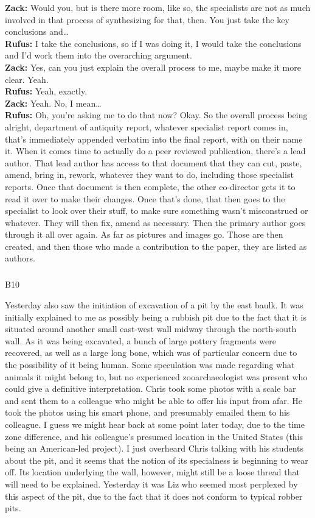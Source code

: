 \documentclass[
  canadian,
]{article}
\makeatletter
\let\oldsubparagraph\subparagraph
\renewcommand{\subparagraph}{
    \@ifstar
      \xxxSubParagraphStar
      \xxxSubParagraphNoStar
  }
\newcommand{\xxxSubParagraphStar}[1]{\oldsubparagraph*{#1}\mbox{}}
\newcommand{\xxxSubParagraphNoStar}[1]{\oldsubparagraph{#1}\mbox{}}
\makeatother
\begin{document}
\textbf{Zack:} Would you, but is there more room, like so, the
specialists are not as much involved in that process of synthesizing for
that, then. You just take the key conclusions and\ldots{}\\
\textbf{Rufus:} I take the conclusions, so if I was doing it, I would
take the conclusions and I'd work them into the overarching argument.\\
\textbf{Zack:} Yes, can you just explain the overall process to me,
maybe make it more clear. Yeah.\\
\textbf{Rufus:} Yeah, exactly.\\
\textbf{Zack:} Yeah. No, I mean\ldots{}\\
\textbf{Rufus:} Oh, you're asking me to do that now? Okay. So the
overall process being alright, department of antiquity report, whatever
specialist report comes in, that's immediately appended verbatim into
the final report, with on their name it. When it comes time to actually
do a peer reviewed publication, there's a lead author. That lead author
has access to that document that they can cut, paste, amend, bring in,
rework, whatever they want to do, including those specialist reports.
Once that document is then complete, the other co-director gets it to
read it over to make their changes. Once that's done, that then goes to
the specialist to look over their stuff, to make sure something wasn't
misconstrued or whatever. They will then fix, amend as necessary. Then
the primary author goes through it all over again. As far as pictures
and images go. Those are then created, and then those who made a
contribution to the paper, they are listed as authors.

\subparagraph{B10}\label{sec-B10}

Yesterday also saw the initiation of excavation of a pit by the east
baulk. It was initially explained to me as possibly being a rubbish pit
due to the fact that it is situated around another small east-west wall
midway through the north-south wall. As it was being excavated, a bunch
of large pottery fragments were recovered, as well as a large long bone,
which was of particular concern due to the possibility of it being
human. Some speculation was made regarding what animals it might belong
to, but no experienced zooarchaeologist was present who could give a
definitive interpretation. Chris took some photos with a scale bar and
sent them to a colleague who might be able to offer his input from afar.
He took the photos using his smart phone, and presumably emailed them to
his colleague. I guess we might hear back at some point later today, due
to the time zone difference, and his colleague's presumed location in
the United States (this being an American-led project). I just overheard
Chris talking with his students about the pit, and it seems that the
notion of its specialness is beginning to wear off. Its location
underlying the wall, however, might still be a loose thread that will
need to be explained. Yesterday it was Liz who seemed most perplexed by
this aspect of the pit, due to the fact that it does not conform to
typical robber pits.
\end{document}
